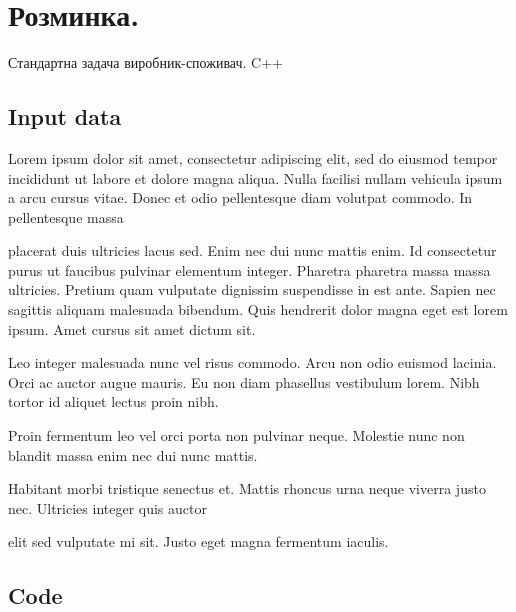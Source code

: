 \documentclass{article}
\begin{document}
 


\section{Розминка.}
\large Стандартна задача виробник-споживач.
C++
\subsection{Input data}
\label{inputdata}
\noindent Lorem ipsum dolor sit amet, consectetur adipiscing elit, sed do eiusmod 
tempor incididunt ut labore et dolore magna aliqua. Nulla facilisi nullam vehicula 
ipsum a arcu cursus vitae. Donec et odio pellentesque diam volutpat commodo. In pellentesque massa

\noindent placerat duis ultricies lacus sed. Enim nec dui nunc mattis enim. Id consectetur purus
ut faucibus pulvinar elementum integer. Pharetra pharetra massa massa ultricies.
Pretium quam vulputate dignissim suspendisse in est ante. Sapien nec sagittis
aliquam malesuada bibendum. Quis hendrerit dolor magna eget est lorem ipsum. Amet cursus sit amet dictum sit.

\noindent Leo integer malesuada nunc vel risus commodo. Arcu non odio euismod lacinia. 
Orci ac auctor augue mauris. Eu non diam phasellus vestibulum lorem. Nibh tortor id aliquet lectus proin nibh.

\noindent Proin fermentum leo vel orci porta non pulvinar neque. Molestie nunc non blandit massa enim nec dui nunc mattis. 

\noindent Habitant morbi tristique senectus et. Mattis rhoncus urna neque viverra justo nec. Ultricies integer quis auctor

\noindent elit sed vulputate mi sit. Justo eget magna fermentum iaculis.

\subsection{Code}
\end{document}
